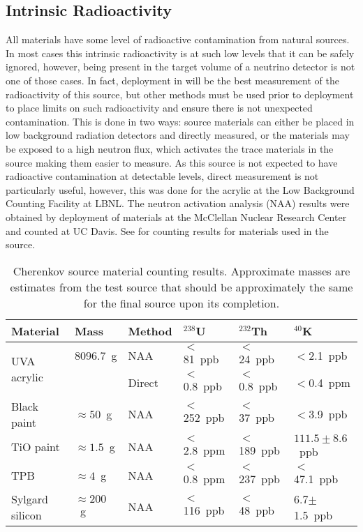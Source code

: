 \subsection{Intrinsic Radioactivity}
\label{sec:matcounting}
All materials have some level of radioactive contamination from natural sources.
In most cases this intrinsic radioactivity is at such low levels that it can be safely ignored, however, being present in the target volume of a neutrino detector is not one of those cases.
In fact, deployment in {\snop} will be the best measurement of the radioactivity of this source, but other methods must be used prior to deployment to place limits on such radioactivity and ensure there is not unexpected contamination.
This is done in two ways: source materials can either be placed in low background radiation detectors and directly measured, or the materials may be exposed to a high neutron flux, which activates the trace materials in the source making them easier to measure.
As this source is not expected to have radioactive contamination at detectable levels, direct measurement is not particularly useful, however, this was done for the acrylic at the Low Background Counting Facility at LBNL.
The neutron activation analysis (NAA) results were obtained by deployment of materials at the McClellan Nuclear Research Center and counted at UC Davis. 
See  for counting results for materials used in the source.

\begin{table}
\centering
\begin{tabular}{|l|l|l|l|l|l|} \hline
Material       & Mass & Method    & $^{238}$U     & $^{232}$Th    & $^{40}$K      \\ \hline
\multirow{2}{*}{UVA acrylic}  & 8096.7~g & NAA    & $<$81~ppb    & $<$24~ppb   & $<$2.1~ppb   \\ \cline{3-6}
& & Direct & $<$0.8~ppb &$<$0.8~ppb & $<$0.4~ppm \\ \hline
Black paint    & $\approx 50$~g & NAA    & $<$252~ppb   & $<$37~ppb   & $<$3.9~ppb           \\ \hline
TiO paint      & $\approx 1.5$~g & NAA    & $<$2.8~ppm   & $<$189~ppb  & $111.5 \pm 8.6$~ppb           \\ \hline
TPB            & $\approx 4$~g & NAA    & $<$0.8~ppm   & $<$237~ppb   & $<$47.1~ppb  \\ \hline
Sylgard silicon& $\approx 200$~g & NAA    & $<$116~ppb   & $<$48~ppb   &6.7$\pm$1.5~ppb\\ \hline
\end{tabular}
\caption{\label{tab:counting} Cherenkov source material counting results. Approximate masses are estimates from the test source that should be approximately the same for the final source upon its completion.}
\end{table}


